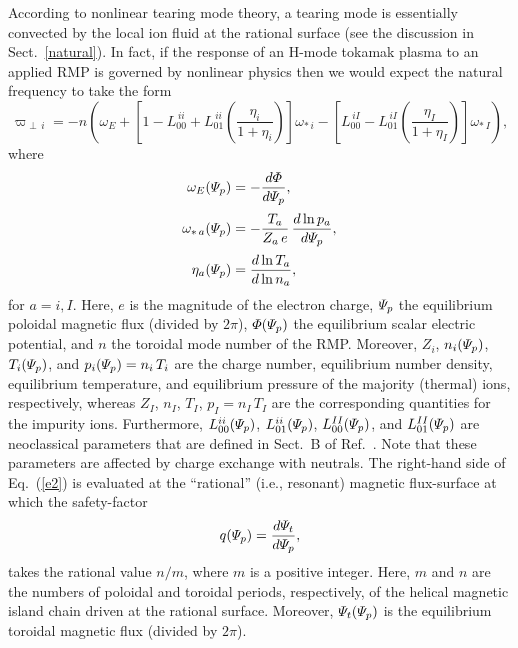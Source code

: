\documentclass[12pt,prb,aps]{revtex4-1}
\begin{document}
According to nonlinear tearing mode theory, a tearing mode is essentially convected by
the local ion fluid at the rational surface (see the discussion in Sect.~\ref{natural}).\cite{nl1,nl2,nl3}
In fact, if the response of an H-mode tokamak plasma to an applied RMP
is governed by nonlinear physics then we would expect the
natural frequency to take the form\,\cite{rf2}
\begin{equation}\label{e2}
\varpi_{\perp\,i} = -n\left(\omega_E +\left[1-L_{00}^{\,ii}+L_{01}^{\,ii}\left(\frac{\eta_i}{1+\eta_i}\right)\right]
\omega_{\ast\,i}
-\left[L_{00}^{\,iI}- L_{01}^{\,iI}\left(\frac{\eta_I}{1+\eta_I}\right)\right]\omega_{\ast\,I}\right),
\end{equation}
where
\begin{align}
\omega_E({\mit\Psi}_p) &= -\frac{d{\mit\Phi}}{d{\mit\Psi}_p},\\[0.5ex]
\omega_{\ast\,a}({\mit\Psi}_p) &=-\frac{T_a}{Z_a\,e}\,\frac{d\ln p_a}{d{\mit\Psi}_p},\\[0.5ex]
\eta_a({\mit\Psi}_p)&=\frac{d\ln T_a}{d\ln n_a},
\end{align}
for $a=i, I$. 
Here,  $e$ is the magnitude of the electron charge, ${\mit\Psi}_p$  the equilibrium poloidal magnetic
flux (divided by $2\pi$), ${\mit\Phi}({\mit\Psi}_p)$ the equilibrium scalar
electric potential, and $n$ the toroidal mode number of the RMP.  Moreover, $Z_i$, $n_i({\mit\Psi}_p)$, $T_i({\mit\Psi}_p)$, and $p_i({\mit\Psi}_p)=n_i\,T_i$   are the charge number, 
equilibrium number density, 
equilibrium temperature, and equilibrium pressure
of the majority (thermal) ions, respectively,
whereas  $Z_I$, $n_I$, $T_I$, $p_I = n_I\,T_I$
are the corresponding quantities for the impurity ions.  
Furthermore, $L_{00}^{ii}({\mit\Psi}_p)$, $L_{01}^{ii}({\mit\Psi}_p)$,  $L_{00}^{II}({\mit\Psi}_p)$, and $L_{01}^{II}({\mit\Psi}_p)$ are neoclassical parameters that are defined
in Sect.~B of Ref.~. Note that these parameters are
affected by charge exchange  with neutrals. 
The right-hand side of Eq.~(\ref{e2}) is evaluated
at the ``rational''  (i.e., resonant) magnetic flux-surface at which the
safety-factor
\begin{equation}
q({\mit\Psi}_p)= \frac{d{\mit\Psi}_t}{d{\mit\Psi}_p},
\end{equation}
takes the rational value $n/m$, where $m$ is a positive integer. Here, $m$ and $n$ are the numbers of poloidal and
toroidal periods, respectively, of the helical magnetic island chain driven at the rational surface. Moreover, ${\mit\Psi}_t({\mit\Psi}_p)$ is the equilibrium toroidal magnetic flux (divided by $2\pi$).
\end{document}
